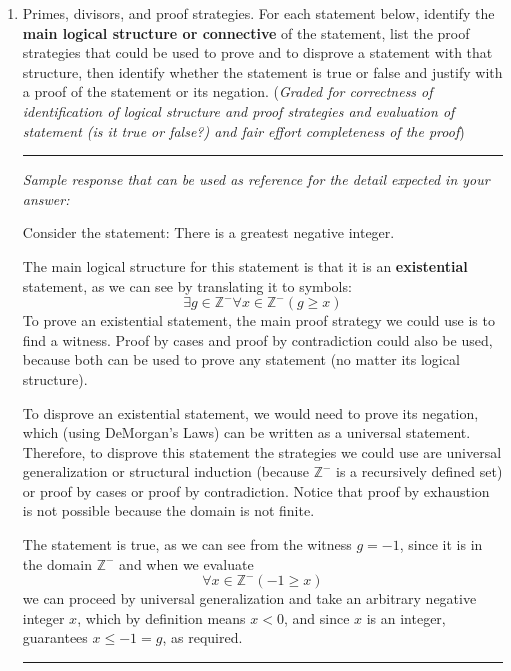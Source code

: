 \documentclass[12pt, oneside]{article}
\begin{document}
\begin{enumerate}[labelindent=0pt, leftmargin=0pt]
    \item Primes, divisors, and proof strategies. For each statement below, identify the {\bf main logical structure or connective} of the 
    statement, list the proof strategies that could be used to prove and to disprove a statement with that structure, 
    then identify whether the statement is true or false and justify with a proof of the statement or its negation. 
    ({\it Graded for correctness of identification of logical structure and proof strategies and evaluation of statement (is it true or false?) 
    and fair effort completeness of the proof}) 


    \rule{0.5\textwidth}{.4pt}
    
    {\it Sample response that can be used as reference for the detail expected 
    in your answer:} 

    Consider the statement: There is a greatest negative integer.

    The main logical structure for this statement is that it is an {\bf existential} statement, as we can 
    see by translating it to symbols: 
    \[
        \exists g \in \mathbb{Z}^{-} \forall x \in \mathbb{Z}^{-} ( g \geq x)
    \]
    To prove an existential statement, the main proof strategy we could use is to find a witness. 
    Proof by cases and proof by contradiction could also be used, because 
    both can be used to prove any statement (no matter its logical structure).

    To disprove an existential statement, we would need to prove its negation, which (using DeMorgan's Laws) can be 
    written as a universal statement. Therefore, to disprove this statement the strategies we could use are 
    universal generalization or structural induction (because $\mathbb{Z}^{-}$ is a recursively defined set) or 
    proof by cases or proof by contradiction. Notice that proof by exhaustion is not possible because the domain is not finite.

    The statement is true, as we can see from the witness $g = -1$, since it is in the domain $\mathbb{Z}^{-}$ and when we evaluate
    \[
        \forall x \in \mathbb{Z}^{-} ( -1 \geq x)
    \]
    we can proceed by universal generalization and take an arbitrary negative integer $x$, which by definition means $x < 0$, 
    and since $x$ is an integer, guarantees $x \leq -1 = g$, as required.
    \rule{0.5\textwidth}{.4pt}


\end{enumerate}
\end{document}
